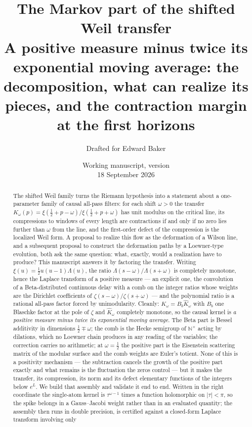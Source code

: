 \documentclass[11pt]{article}
\title{The Markov part of the shifted Weil transfer\\[5pt]
\large A positive measure minus twice its exponential moving average:
the decomposition, what can realize its pieces, and the contraction margin at
the first horizons}
\author{Drafted for Edward Baker}
\date{Working manuscript, version \draftversion\\18 September 2026}
\numberwithin{equation}{section}
\theoremstyle{definition}
\theoremstyle{remark}
\newcommand{\N}{\mathbb N}
\newcommand{\Kh}{\widehat K}
\begin{document}
\maketitle
\begin{abstract}
The shifted Weil family turns the Riemann hypothesis into a statement about a
one-parameter family of causal all-pass filters: for each shift $\omega>0$ the
transfer $K_\omega(p)=\xi(\frac12+p-\omega)/\xi(\frac12+p+\omega)$ has unit
modulus on the critical line, its compressions to windows of every length are
contractions if and only if no zero lies further than $\omega$ from the line,
and the first-order defect of the compression is the localized Weil form. A
proposal to realize this flow as the deformation of a Wilson line, and a
subsequent proposal to construct the deformation paths by a Loewner-type
evolution, both ask the same question: what, exactly, would a realization have
to produce? This manuscript answers it by factoring the transfer. Writing
$\xi(u)=\frac12u(u-1)\Lambda(u)$, the ratio $\Lambda(s-\omega)/\Lambda(s+\omega)$
is completely monotone, hence the Laplace transform of a positive measure ---
an explicit one, the convolution of a Beta-distributed continuous delay with a
comb on the integer ratios whose weights are the Dirichlet coefficients of
$\zeta(s-\omega)/\zeta(s+\omega)$ --- and the polynomial ratio is a rational
all-pass factor forced by unimodularity. Cleanly: $K_\omega=B_b\Kh_\omega$ with
$B_b$ one Blaschke factor at the pole of $\zeta$ and $\Kh_\omega$ completely
monotone, so the causal kernel is \emph{a positive measure minus twice its
exponential moving average}. The Beta part is Bessel additivity in dimensions
$\frac12\mp\omega$; the comb is the Hecke semigroup of $\N^\times$ acting by
dilations, which no Loewner chain produces in any reading of the variables; the
correction carries no arithmetic; at $\omega=\frac12$ the positive part is the
Eisenstein scattering matrix of the modular surface and the comb weights are
Euler's totient. None of this is a positivity mechanism --- the subtraction
cancels the growth of the positive part exactly and what remains is the
fluctuation the zeros control --- but it makes the transfer, its compression,
its norm and its defect elementary functions of the integers below $e^L$. We
build that assembly and validate it end to end. Written in the right
coordinate the single-atom kernel is $\tau^{\omega-1}$ times a function
holomorphic on $|\tau|<\pi$, so the spike belongs in a Gauss--Jacobi weight
rather than in an evaluated quantity; the assembly then runs in double
precision, is certified against a closed-form Laplace transform involving only

\end{abstract}
\end{document}
